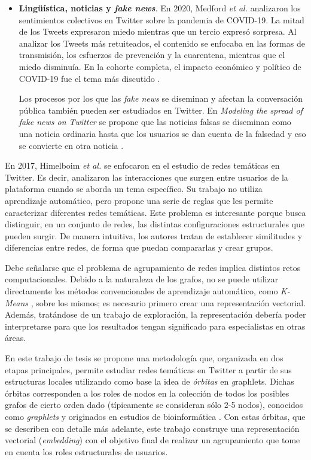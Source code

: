 \begin{itemize}
    \item \textbf{Lingüística, noticias y \textit{fake news}}. En 2020, Medford \textit{et al.} analizaron los sentimientos colectivos en Twitter sobre la pandemia de COVID-19. La mitad de los Tweets expresaron miedo mientras que un tercio expresó sorpresa. Al analizar los Tweets más retuiteados, el contenido se enfocaba en las formas de transmisión, los esfuerzos de prevención y la cuarentena, mientras que el miedo disminuía. En la cohorte completa, el impacto económico y político de COVID-19 fue el tema más discutido \cite{medford_infodemic_2020}. 

    Los procesos por los que las \textit{fake news} se diseminan y afectan la conversación pública también pueden ser estudiados en Twitter. En \textit{Modeling the spread of fake news on Twitter} se propone que las noticias falsas se diseminan como una noticia ordinaria hasta que los usuarios se dan cuenta de la falsedad y eso se convierte en otra noticia \cite{murayama_modeling_2021}.

\end{itemize}

En 2017, Himelboim \textit{ et al.} \cite{himelboim_classifying_2017} se enfocaron en el estudio de redes temáticas en Twitter. Es decir, analizaron las interacciones que surgen entre usuarios de la plataforma cuando se aborda un tema específico. Su trabajo no utiliza aprendizaje automático, pero propone una serie de reglas que les permite caracterizar diferentes redes temáticas. Este problema es interesante porque busca distinguir, en un conjunto de redes, las distintas configuraciones estructurales que pueden surgir. De manera intuitiva, los autores tratan de establecer similitudes y diferencias entre redes, de forma que puedan compararlas y crear grupos. 

Debe señalarse que el problema de agrupamiento de redes implica distintos retos computacionales. Debido a la naturaleza de los grafos, no se puede utilizar directamente los métodos convencionales de aprendizaje automático, como \textit{K-Means} \cite{bejar_k-means_nodate}, sobre los mismos; es necesario primero crear una representación vectorial. Además, tratándose de un trabajo de exploración, la representación debería poder interpretarse para que los resultados tengan significado para especialistas en otras áreas. 

En este trabajo de tesis se propone una metodología que, organizada en dos etapas principales, permite estudiar redes temáticas en Twitter a partir de sus estructuras locales utilizando como base la idea de \textit{órbitas} \cite{sarajlic_graphlet-based_2016} en {\emph graphlets}. Dichas órbitas corresponden a los roles de nodos en la colección de todos los posibles grafos de cierto orden dado (típicamente se consideran sólo 2-5 nodos), conocidos como \textit{graphlets} y originados en estudios de bioinformática \cite{przulj_biological_2007}. Con estas órbitas, que se describen con detalle más adelante, este trabajo construye una representación vectorial (\textit{embedding}) con el objetivo final de realizar un agrupamiento que tome en cuenta los roles estructurales de usuarios.

